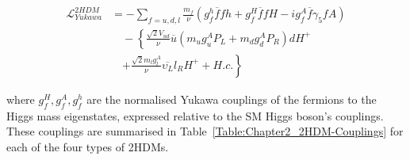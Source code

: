 \begin{equation}
\begin{aligned}
    \mathcal{L}_{Yukawa}^{2HDM} &= - \sum\limits_{f=u,d,l} \frac{m_f}{\nu} 
    \left(g_f^h \overline{f}f h + g_f^H\overline{f}f H - i g_f^A\overline{f} \gamma_5 f A \right) \\
    &\quad - \left\{ \frac{\sqrt{2}V_{ud}}{\nu} \overline{u} 
    \left(m_u g_u^A P_L + m_d g_d^A P_R \right) d H^+ \right. \\
    &\quad \left. + \frac{\sqrt{2}m_l g_{l}^A}{\nu} \overline{\upsilon
_L} l_R H^+ + H.c. \right\}
\end{aligned}
\label{Equation:Chapter2_2HDM-YukawaLagrangian}
\end{equation}

where $g_f^H,g_f^A,g_f^h$ are the normalised Yukawa couplings of the fermions to the Higgs mass eigenstates, expressed relative to the SM Higgs boson's couplings. These couplings are summarised in Table~\ref{Table:Chapter2_2HDM-Couplings} for each of the four types of 2HDMs.


